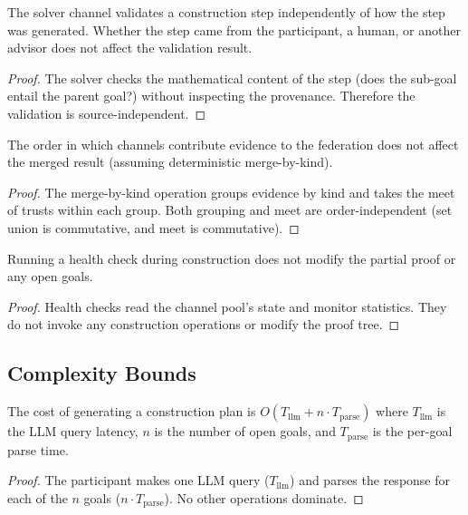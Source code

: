 \documentclass[11pt]{article}
\begin{document}
\begin{lemma}%
\label{lem:solverindep}
The solver channel validates a construction step independently
of how the step was generated.  Whether the step came from
the participant, a human, or another advisor does not affect
the validation result.
\end{lemma}
\begin{proof}
The solver checks the mathematical content of the step
(does the sub-goal entail the parent goal?) without
inspecting the provenance.  Therefore the validation is
source-independent.
\end{proof}

\begin{lemma}%
\label{lem:fedorderindep}
The order in which channels contribute evidence to the
federation does not affect the merged result (assuming
deterministic merge-by-kind).
\end{lemma}
\begin{proof}
The merge-by-kind operation groups evidence by kind and
takes the meet of trusts within each group.  Both grouping
and meet are order-independent (set union is commutative,
and meet is commutative).
\end{proof}

\begin{lemma}%
\label{lem:healthnomod}
Running a health check during construction does not modify
the partial proof or any open goals.
\end{lemma}
\begin{proof}
Health checks read the channel pool's state and monitor
statistics.  They do not invoke any construction operations
or modify the proof tree.
\end{proof}

\subsection{Complexity Bounds}

\begin{lemma}%
\label{lem:plancost}
The cost of generating a construction plan is
$O(T_{\mathrm{llm}} + n \cdot T_{\mathrm{parse}})$
where $T_{\mathrm{llm}}$ is the LLM query latency, $n$ is
the number of open goals, and $T_{\mathrm{parse}}$ is the
per-goal parse time.
\end{lemma}
\begin{proof}
The participant makes one LLM query ($T_{\mathrm{llm}}$) and
parses the response for each of the $n$ goals
($n \cdot T_{\mathrm{parse}}$).  No other operations dominate.
\end{proof}
\end{document}
